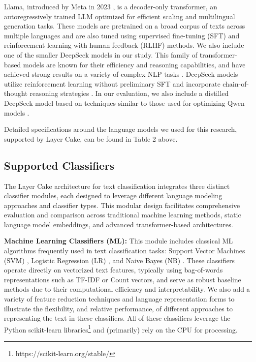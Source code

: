 \documentclass[final]{clv2025}
\begin{document}
Llama, introduced by Meta in 2023 \cite{touvron2023llama}, is a decoder-only transformer, an autoregressively trained LLM optimized for efficient scaling and multilingual generation tasks. These models are pretrained on a broad corpus of texts across multiple languages and are also tuned using supervised fine-tuning (SFT) and reinforcement learning with human feedback (RLHF) methods. We also include one of the smaller DeepSeek models in our study. This family of transformer-based models are known for their efficiency and reasoning capabilities, and have achieved strong results on a variety of complex NLP tasks \cite{articlebi, guo2025deepseek}. DeepSeek models utilize reinforcement learning without preliminary SFT \cite{ouyang2022training} and incorporate chain-of-thought reasoning strategies \cite{articlewei}. In our evaluation, we also include a distilled DeepSeek model based on techniques similar to those used for optimizing Qwen models \cite{articlebai, hinton2015distilling}.

Detailed specifications around the language models we used for this research, supported by Layer Cake, can be found in Table 2 above.

\subsection{Supported Classifiers}

The Layer Cake architecture for text classification integrates three distinct classifier modules, each designed to leverage different language modeling approaches and classifier types. This modular design facilitates comprehensive evaluation and comparison across traditional machine learning methods, static language model embeddings, and advanced transformer-based architectures.

\textbf{Machine Learning Classifiers (ML):} This module includes classical ML algorithms frequently used in text classification tasks: Support Vector Machines (SVM) \cite{joachims1998text}, Logistic Regression (LR) \cite{genkin01082007}, and Naive Bayes (NB) \cite{mccallum1998comparison}. These classifiers operate directly on vectorized text features, typically using bag-of-words representations such as TF-IDF or Count vectors, and serve as robust baseline methods due to their computational efficiency and interpretability. We also add a variety of feature reduction techniques and language representation forms to illustrate the flexibility, and relative performance, of different approaches to representing the text in these classifiers. All of these classifiers leverage the Python scikit-learn libraries\footnote{https://scikit-learn.org/stable/} and (primarily) rely on the CPU for processing.
\end{document}
